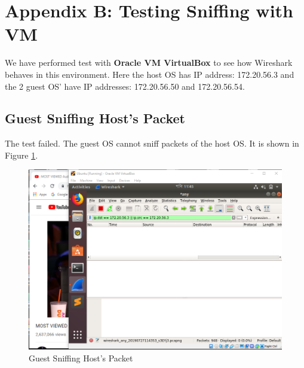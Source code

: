 \documentclass[14pt]{extarticle}
\begin{document}
\section{Appendix B: Testing Sniffing with VM}
    \label{apx:test_wireshark}
    We have performed test with \textbf{Oracle VM VirtualBox} to see how Wireshark behaves in this environment. Here the host OS has IP address: 172.20.56.3 and the 2 guest OS' have IP addresses: 172.20.56.50 and 172.20.56.54.
    
    \subsection{Guest Sniffing Host's Packet}
        The test failed. The guest OS cannot sniff packets of the host OS. It is shown in Figure \ref{fig:vm2main}.
        \begin{figure}
            \centering
            \includegraphics[width=.95\textwidth]{Pictures/VM1_to_main.png}
            \caption{Guest Sniffing Host's Packet}
            \label{fig:vm2main}
        \end{figure}
    
\end{document}
